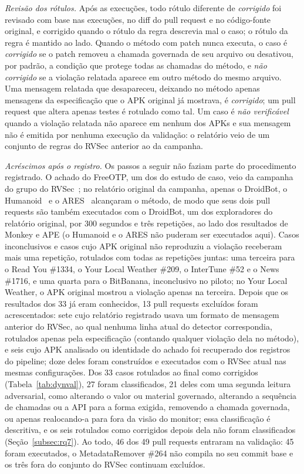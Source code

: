 \documentclass[conference]{IEEEtran}
\begin{document}
\emph{Revisão dos rótulos.} Após as execuções, todo rótulo diferente de
\emph{corrigido} foi revisado com base nas execuções, no diff do pull request e no
código-fonte original, e corrigido quando o rótulo da regra descrevia mal o caso;
o rótulo da regra é mantido ao lado. Quando o método com patch nunca executa, o
caso é \emph{corrigido} se o patch removeu a chamada governada de seu arquivo ou
desativou, por padrão, a condição que protege todas as chamadas do método, e
\emph{não corrigido} se a violação relatada aparece em outro método do mesmo
arquivo. Uma mensagem relatada que desapareceu, deixando no método apenas
mensagens da especificação que o APK original já mostrava, é \emph{corrigido}; um
pull request que altera apenas testes é rotulado como tal. Um caso é \emph{não
verificável} quando a violação relatada não aparece em nenhum dos APKs e sua
mensagem não é emitida por nenhuma execução da validação: o relatório veio de um
conjunto de regras do RVSec anterior ao da campanha.

\emph{Acréscimos após o registro.} Os passos a seguir não faziam parte do
procedimento registrado. O achado do FreeOTP, um dos do estudo de caso, veio da
campanha do grupo do RVSec~\cite{costa2026effectiveness}; no relatório original
da campanha, apenas o DroidBot, o Humanoid~\cite{li2019humanoid} e o
ARES~\cite{romdhana2022ares} alcançaram o método, de modo que seus dois pull
requests são também executados com o DroidBot, um dos exploradores do relatório
original, por 300 segundos e três repetições, ao lado dos resultados de Monkey e
APE (o Humanoid e o ARES não puderam ser executados aqui). Casos inconclusivos e
casos cujo APK original não reproduziu a violação receberam mais uma repetição,
rotulados com todas as repetições juntas: uma terceira para o Read You \#1334,
o Your Local Weather \#209, o InterTune \#52 e o News \#1716, e uma quarta para
o BitBanana, inconclusivo no piloto; no Your Local Weather, o APK original
mostrou a violação apenas na terceira. Depois que os resultados dos
33 já eram conhecidos, 13 pull requests excluídos foram acrescentados: sete cujo
relatório registrado usava um formato de mensagem anterior do RVSec, ao qual
nenhuma linha atual do detector correspondia, rotulados apenas pela especificação
(contando qualquer violação dela no método), e seis cujo APK analisado ou
identidade do achado foi recuperado dos registros do pipeline; doze deles foram
construídos e executados com o RVSec atual nas mesmas configurações. Dos 33 casos
rotulados ao final como corrigidos (Tabela~\ref{tab:dynval}), 27 foram
classificados, 21 deles com uma segunda leitura adversarial, como
alterando o valor ou material governado, alterando a sequência de chamadas ou a
API para a forma exigida, removendo a chamada governada, ou apenas realocando-a
para fora da visão do monitor; essa classificação é descritiva, e os seis
rotulados como corrigidos depois dela não foram classificados
(Seção~\ref{subsec:rq7}). Ao todo, 46 dos 49
pull requests entraram na validação: 45 foram executados, o MetadataRemover \#264
não compila no seu commit base e os três fora do conjunto do RVSec continuam
excluídos.
\end{document}
